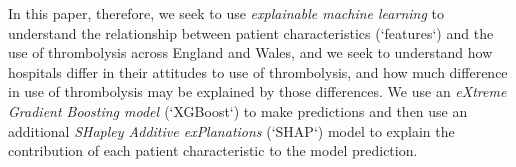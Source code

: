 
In this paper, therefore, we seek to use \emph{explainable machine learning} to understand the relationship between patient characteristics (`features`) and the use of thrombolysis across England and Wales, and we seek to understand how hospitals differ in their attitudes to use of thrombolysis, and how much difference in use of thrombolysis may be explained by those differences. We use an \emph{eXtreme Gradient Boosting model \cite{chen_xgboost_2016}} (`XGBoost`) to make predictions and then use an additional \emph{SHapley Additive exPlanations} \cite{lundberg_unified_2017} (`SHAP`) model to explain the contribution of each patient characteristic to the model prediction.